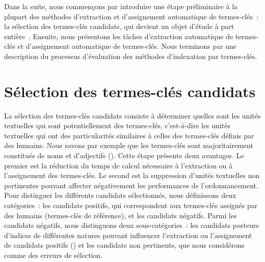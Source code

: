     Dans la suite, nous commençons par introduire une étape préliminaire à la
    plupart des méthodes d'extraction et d'assignement automatique de
    termes-clés~: la sélection des termes-clés candidats, qui devient un objet
    d'étude à part entière~\cite{wang2014keyphraseextractionpreprocessing}.
    Ensuite, nous présentons les tâches d'extraction automatique de termes-clés
    et d'assignement automatique de termes-clés. Nous terminons par une
    description du processus d'évaluation des méthodes d'indexation par
    termes-clés.


  \section{Sélection des termes-clés candidats}
  \label{sec:main-state_of_the_art-keyphrase_candidate_selection}
    La sélection des termes-clés candidats consiste à déterminer quelles sont
    les unités textuelles qui sont potentiellement des termes-clés, c'est-à-dire
    les unités textuelles qui ont des particularités similaires à celles des
    termes-clés définis par des humains. Nous savons par exemple que les
    termes-clés sont majoritairement constitués de noms et d'adjectifs
    (). Cette étape présente deux avantages. Le premier est la
    réduction du temps de calcul nécessaire à l'extraction ou à l'assignement
    des termes-clés. Le second est la suppression d'unités textuelles non
    pertinentes pouvant affecter négativement les performances de
    l'ordonnancement. Pour distinguer les différents candidats sélectionnés,
    nous définissons deux catégories~: les candidats positifs, qui
    correspondent aux termes-clés assignés par des humains (termes-clés de
    référence), et les candidats négatifs. Parmi les candidats négatifs,
    nous distinguons deux sous-catégories~: les candidats porteurs
    d'indices de différentes natures pouvant influencer
    l'extraction ou l'assignement de candidats positifs () et les
    candidats non pertinents, que nous considérons comme des
    erreurs de sélection.

